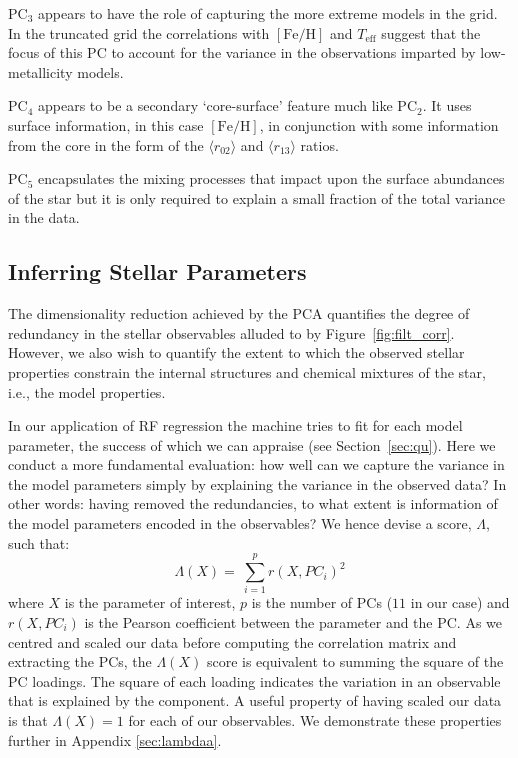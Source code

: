 PC$_3$ appears to have the role of capturing the more extreme models in the grid. 
In the truncated grid the correlations with $[\text{Fe/H}]$ and $T_{\text{eff}}$ suggest that the focus of this PC to account for the variance in the observations imparted by low-metallicity models. 

PC$_4$ appears to be a secondary `core-surface' feature much like PC$_2$.  
It uses surface information, in this case ${[\text{Fe/H}]}$, in conjunction with some information from the core in the form of the ${\langle r_{02}\rangle}$ and ${\langle r_{13}\rangle}$ ratios.  

PC$_5$ encapsulates the mixing processes that impact upon the surface abundances of the star but it is only required to explain a small fraction of the total variance in the data. 






\subsection{Inferring Stellar Parameters} 
\label{sec:ISP}



The dimensionality reduction achieved by the PCA quantifies the degree of redundancy in the stellar observables alluded to by Figure~\ref{fig:filt_corr}. 
However, we also wish to quantify the extent to which the observed stellar properties constrain the internal structures and chemical mixtures of the star, i.e., the model properties. 


In our application of RF regression the machine tries to fit for each model parameter, the success of which we can appraise (see Section~\ref{sec:qu}). 
Here we conduct a more fundamental evaluation: how well can we capture the variance in the model parameters simply by explaining the variance in the observed data? 
In other words: having removed the redundancies, to what extent is information of the model parameters encoded in the observables? We hence devise a score, $\Lambda$, such that:
\begin{equation}
   \Lambda(X) = \  \sum^{p}_{i=1}  r(X, PC_i)^2
\end{equation}
where $X$ is the parameter of interest, $p$ is the number of PCs ($11$ in our case)  and  ${r(X, PC_i)}$ is the Pearson coefficient between the parameter and the PC.
As we centred and scaled our data before computing the correlation matrix and extracting the PCs, the $\Lambda(X)$ score is equivalent to summing the square of the PC loadings. The square of each loading indicates the variation in an observable that is explained by the component. A useful property of having scaled our data is that ${\Lambda(X) =1}$  for each of our observables. We demonstrate these properties further in Appendix \ref{sec:lambdaa}.

